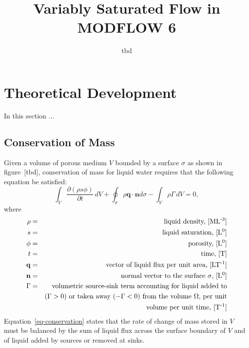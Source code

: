 \documentclass[fleqn]{article}
\author{tbd}
\begin{document}
\title{Variably Saturated Flow in MODFLOW 6}
\maketitle

\tableofcontents

\section{Theoretical Development}
In this section ...

\subsection{Conservation of Mass}
Given a volume of porous medium $V$ bounded by a surface $\sigma$ as
shown in figure~[tbd], conservation of mass for liquid water
requires that the following equation be satisfied:
\begin{equation}
  \int_V \frac{\partial (\rho s \phi)}{\partial t} \,dV +
  \oint_\sigma \rho \mathbf{q} \cdot \mathbf{n} d\sigma -
  \int_V \rho \Gamma \,dV = 0,
  \label{eq-conservation}
\end{equation}
where
\begin{eqnarray*}
  \rho &=& \textrm{liquid density, [ML\textsuperscript{-3}]} \\
  s &=& \textrm{liquid saturation, [L\textsuperscript{0}]} \\
  \phi &=& \textrm{porosity, [L\textsuperscript{0}]} \\
  t &=& \textrm{time, [T]} \\
  \mathbf{q} &=& \textrm{vector of liquid flux per unit area, [LT\textsuperscript{-1}]} \\
  \mathbf{n} &=& \textrm{normal vector to the surface $\sigma$, [L\textsuperscript{0}]} \\
  \Gamma &=& \textrm{volumetric source-sink term accounting for liquid added to} \\
         && \textrm{($\Gamma > 0$) or taken away ($-\Gamma < 0$) from the volume $\Omega$, per unit} \\
         && \textrm{volume per unit time, [T\textsuperscript{-1}]}
\end{eqnarray*}
Equation~\ref{eq-conservation} states that the rate of change of
mass stored in $V$ must be balanced by the sum of liquid flux across
the surface boundary of $V$ and of liquid added by sources or removed
at sinks.
\end{document}
